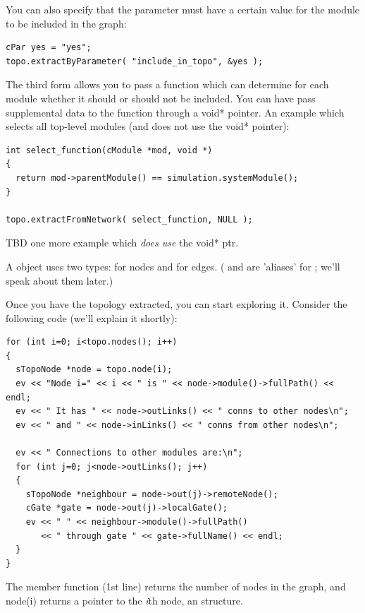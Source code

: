 You can also specify that the parameter must have a certain value 
for the module to be included in the graph:

\begin{Verbatim}
cPar yes = "yes";
topo.extractByParameter( "include_in_topo", &yes );
\end{Verbatim}

The third form allows you to pass a function which can determine for
each module whether it should or should not be included.  You can have
 pass supplemental data to the function through a
void* pointer. An example which selects all top-level modules (and
does not use the void* pointer):

\begin{Verbatim}
int select_function(cModule *mod, void *)
{
  return mod->parentModule() == simulation.systemModule();
}

topo.extractFromNetwork( select_function, NULL );
\end{Verbatim}

TBD one more example which \textit{does use} the void* ptr.


A  object uses two types:  for
nodes and  for edges. ( and
 are 'aliases' for ; we'll
speak about them later.)

Once you have the topology extracted, you can start exploring 
it. Consider the following code (we'll explain it shortly):

\begin{Verbatim}
for (int i=0; i<topo.nodes(); i++)
{
  sTopoNode *node = topo.node(i);
  ev << "Node i=" << i << " is " << node->module()->fullPath() << endl;
  ev << " It has " << node->outLinks() << " conns to other nodes\n"; 
  ev << " and " << node->inLinks() << " conns from other nodes\n";

  ev << " Connections to other modules are:\n"; 
  for (int j=0; j<node->outLinks(); j++)
  {
    sTopoNode *neighbour = node->out(j)->remoteNode();
    cGate *gate = node->out(j)->localGate();
    ev << " " << neighbour->module()->fullPath()
       << " through gate " << gate->fullName() << endl;
  }
}
\end{Verbatim}

The  member function (1st line) returns the number of 
nodes in the graph, and node(i) returns a pointer to the \textit{i}th 
node, an  structure.


